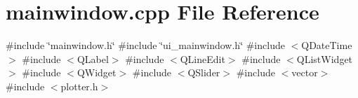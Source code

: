 \section{mainwindow.\+cpp File Reference}
\label{mainwindow_8cpp}
{\ttfamily \#include \char`\"{}mainwindow.\+h\char`\"{}}\newline
{\ttfamily \#include \char`\"{}ui\+\_\+mainwindow.\+h\char`\"{}}\newline
{\ttfamily \#include $<$Q\+Date\+Time$>$}\newline
{\ttfamily \#include $<$Q\+Label$>$}\newline
{\ttfamily \#include $<$Q\+Line\+Edit$>$}\newline
{\ttfamily \#include $<$Q\+List\+Widget$>$}\newline
{\ttfamily \#include $<$Q\+Widget$>$}\newline
{\ttfamily \#include $<$Q\+Slider$>$}\newline
{\ttfamily \#include $<$vector$>$}\newline
{\ttfamily \#include $<$plotter.\+h$>$}\newline
